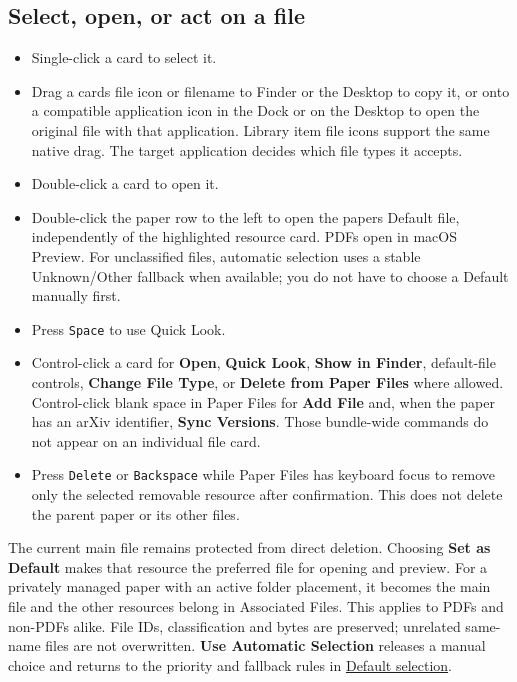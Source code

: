 \documentclass[10pt,letterpaper,oneside]{scrreprt}
\providecommand{\tightlist}{\setlength{\itemsep}{1pt}\setlength{\parskip}{0pt}}
\begin{document}
\subsection{Select, open, or act on a file}\label{select-open-or-act-on-a-file}

\begin{itemize}
\tightlist
\item
  Single-click a card to select it.
\item
  Drag a card\textquotesingle s file icon or filename to Finder or the Desktop to copy it, or onto a compatible application icon in the Dock or on the Desktop to open the original file with that application. Library item file icons support the same native drag. The target application decides which file types it accepts.
\item
  Double-click a card to open it.
\item
  Double-click the paper row to the left to open the paper\textquotesingle s Default file, independently of the highlighted resource card. PDFs open in macOS Preview. For unclassified files, automatic selection uses a stable Unknown/Other fallback when available; you do not have to choose a Default manually first.
\item
  Press \texttt{Space} to use Quick Look.
\item
  Control-click a card for \textbf{Open}, \textbf{Quick Look}, \textbf{Show in Finder}, default-file controls, \textbf{Change File Type}, or \textbf{Delete from Paper Files} where allowed. Control-click blank space in Paper Files for \textbf{Add File} and, when the paper has an arXiv identifier, \textbf{Sync Versions}. Those bundle-wide commands do not appear on an individual file card.
\item
  Press \texttt{Delete} or \texttt{Backspace} while Paper Files has keyboard focus to remove only the selected removable resource after confirmation. This does not delete the parent paper or its other files.
\end{itemize}

The current main file remains protected from direct deletion. Choosing \textbf{Set as Default} makes that resource the preferred file for opening and preview. For a privately managed paper with an active folder placement, it becomes the main file and the other resources belong in Associated Files. This applies to PDFs and non-PDFs alike. File IDs, classification and bytes are preserved; unrelated same-name files are not overwritten. \textbf{Use Automatic Selection} releases a manual choice and returns to the priority and fallback rules in \hyperref[versions-current]{Default selection}.
\end{document}
